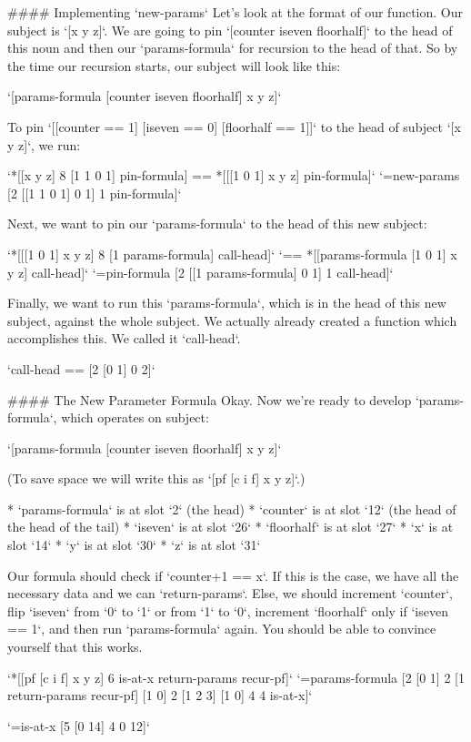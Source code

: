\documentclass[twoside]{article}
\begin{document}
#### Implementing `new-params`
Let's look at the format of our function. Our subject is `[x y z]`. We are going to pin `[counter iseven floorhalf]` to the head of this noun and then our `params-formula` for recursion to the head of that. So by the time our recursion starts, our subject will look like this:

`[params-formula [counter iseven floorhalf] x y z]`

To pin `[[counter == 1] [iseven == 0] [floorhalf == 1]]` to the head of subject `[x y z]`, we run:

`*[[x y z] 8 [1 1 0 1] pin-formula] == *[[[1 0 1] x y z] pin-formula]`  
`=new-params [2 [[1 1 0 1] 0 1] 1 pin-formula]`

Next, we want to pin our `params-formula` to the head of this new subject:

`*[[[1 0 1] x y z] 8 [1 params-formula] call-head]`  
`== *[[params-formula [1 0 1] x y z] call-head]`  
`=pin-formula [2 [[1 params-formula] 0 1] 1 call-head]`  

Finally, we want to run this `params-formula`, which is in the head of this new subject, against the whole subject. We actually already created a function which accomplishes this. We called it `call-head`.

`call-head == [2 [0 1] 0 2]`

#### The New Parameter Formula
Okay. Now we're ready to develop `params-formula`, which operates on subject:

`[params-formula [counter iseven floorhalf] x y z]`

(To save space we will write this as `[pf [c i f] x y z]`.)

* `params-formula` is at slot `2` (the head)
* `counter` is at slot `12` (the head of the head of the tail)
* `iseven` is at slot `26`
* `floorhalf` is at slot `27` 
* `x` is at slot `14`
* `y` is at slot `30`
* `z` is at slot `31`

Our formula should check if `counter+1 == x`. If this is the case, we have all the necessary data and we can `return-params`. Else, we should increment `counter`, flip `iseven` from `0` to `1` or from `1` to `0`, increment `floorhalf` only if `iseven == 1`, and then run `params-formula` again. You should be able to convince yourself that this works.

`*[[pf [c i f] x y z] 6 is-at-x return-params recur-pf]`  
`=params-formula [2 [0 1] 2 [1 return-params recur-pf] [1 0] 2 [1 2 3] [1 0] 4 4 is-at-x]`  

`=is-at-x [5 [0 14] 4 0 12]`
\end{document}
